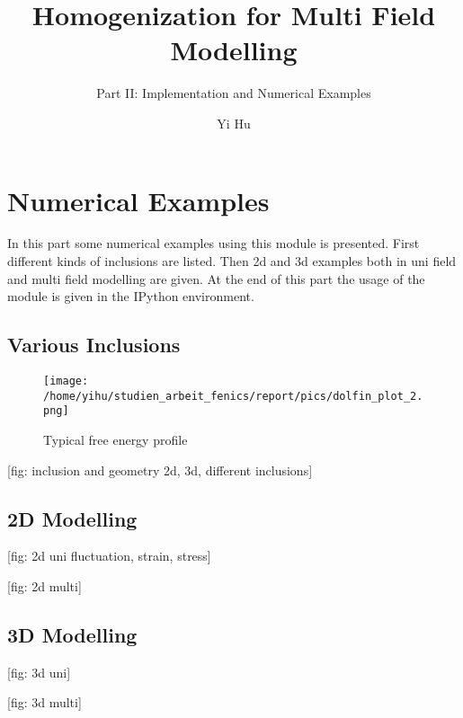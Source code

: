 \documentclass[10pt,a4paper]{scrreprt}
\author{Yi Hu}
\title{Homogenization for Multi Field Modelling}
\subtitle{Part II: Implementation and Numerical Examples}
\begin{document}
\chapter{Numerical Examples}
In this part some numerical examples using this module is presented. First different kinds of inclusions are listed. Then 2d and 3d examples both in uni field and multi field modelling are given. At the end of this part the usage of the module is given in the IPython environment.

\section{Various Inclusions}
\begin{figure}[h]
\centering
\texttt{[image: /home/yihu/studien\_arbeit\_fenics/report/pics/dolfin\_plot\_2.png]}
\caption{Typical free energy profile}
\label{fig:meta}
\end{figure}

[fig: inclusion and geometry 2d, 3d, different inclusions]

\section{2D Modelling}
[fig: 2d uni fluctuation, strain, stress]

[fig: 2d multi]

\section{3D Modelling}
[fig: 3d uni]

[fig: 3d multi]
\end{document}

